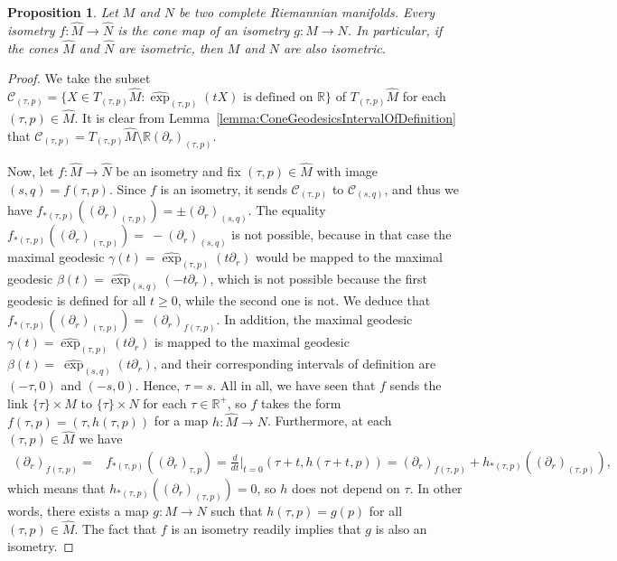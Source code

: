 \documentclass[11pt,a4paper,final]{amsart}
\newcommand{\R}{\mathbb{R}}
\renewcommand{\hat}{\widehat}
\newtheorem{proposition}[theorem]{Proposition}
\theoremstyle{definition}
\begin{document}
\begin{proposition}\label{prop:IsometricCones}
	Let $M$ and $N$ be two complete Riemannian manifolds. Every isometry $f\colon \hat{M}\to \hat{N}$ is the cone map of an isometry $g\colon M\to N$. In particular, 	if the cones $\hat{M}$ and $\hat{N}$ are isometric, then $M$ and $N$ are also isometric.
\end{proposition}
\begin{proof}
	We take the subset $\mathcal{C}_{(\tau,p)}=\{ X\in T_{(\tau,p)}\hat{M}\colon \hat{\exp}_{(\tau,p)}(tX)\text{ is defined on }\R \}$ of $T_{(\tau,p)}\hat{M}$ for each $(\tau,p)\in \hat{M}$.
	It is clear from Lemma~\ref{lemma:ConeGeodesicsIntervalOfDefinition} that $\mathcal{C}_{(\tau,p)}=T_{(\tau,p)}\hat{M}\setminus \R (\partial_{r})_{(\tau,p)}$.
	
	Now, let $f\colon \hat{M}\to\hat{N}$ be an isometry and fix $(\tau,p)\in \hat{M}$ with image $(s,q)=f(\tau,p)$.
	Since $f$ is an isometry, it sends $\mathcal{C}_{(\tau,p)}$ to $\mathcal{C}_{(s,q)}$, and thus we have $f_{*(\tau,p)}((\partial_{r})_{(\tau,p)})=\pm (\partial_{r})_{(s,q)}$.
	The equality $f_{*(\tau,p)}((\partial_{r})_{(\tau,p)})=~- (\partial_{r})_{(s,q)}$ is not possible, because in that case the maximal geodesic $\gamma(t)=\hat{\operatorname{exp}}_{(\tau,p)}(t\partial_r)$ would be mapped to the maximal geodesic $\beta(t)=\hat{\operatorname{exp}}_{(s,q)}(-t\partial_r)$, which is not possible because the first geodesic is defined for all $t\geq 0$, while the second one is not.
	We deduce that $f_{*(\tau,p)}((\partial_{r})_{(\tau,p)})=~(\partial_{r})_{f(\tau,p)}$.
	In addition, the maximal geodesic $\gamma(t)=\hat{\operatorname{exp}}_{(\tau,p)}(t\partial_r)$ is mapped to the maximal geodesic $\beta(t)=~\hat{\operatorname{exp}}_{(s,q)}(t\partial_r)$, and their corresponding intervals of definition are $(-\tau,0)$ and $(-s,0)$.
	Hence, $\tau=s$.
	All in all, we have seen that $f$ sends the link $\{\tau\}\times M$ to $\{\tau\}\times N$ for each $\tau\in \R^+$, so $f$ takes the form $f(\tau,p)=(\tau,h(\tau,p))$ for a map $h\colon \hat{M}\to N$.
	Furthermore, at each $(\tau,p)\in\hat{M}$ we have
	\[
		\begin{aligned}
			(\partial_{r})_{f(\tau,p)}={}&f_{*(\tau,p)}((\partial_{r})_{\tau,p})=\frac{d}{dt}\bigg\vert_{t=0}(\tau+t,h(\tau+t,p))=(\partial_{r})_{f(\tau,p)}+h_{*(\tau,p)}((\partial_{r})_{(\tau,p)}),
		\end{aligned}
	\]
	which means that $h_{*(\tau,p)}((\partial_{r})_{(\tau,p)})=0$, so $h$ does not depend on $\tau$.
	In other words, there exists a map $g\colon M\to N$ such that $h(\tau,p)=g(p)$ for all $(\tau,p)\in\hat{M}$.
	The fact that $f$ is an isometry readily implies that $g$ is also an isometry. \qedhere
\end{proof}
\end{document}
